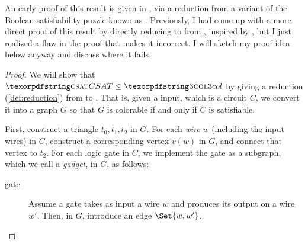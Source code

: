 An early proof of this result is given in \textcite{karp.np}, via a reduction
from a variant of the Boolean satisfiability puzzle known as
.  Previously, I had come up with a more direct proof of this
result by directly reducing to  from \CSAT, inspired by
\textcite{potapov.3col}, but I just realized a flaw in the proof that makes it
incorrect.  I will sketch my proof idea below anyway and discuss where it
fails.


\begin{aside}
\begin{proof}
  We will show that \(\CSAT \le \Problem{3col}\) by giving a reduction
  (\cref{def:reduction}) from \CSAT{} to .  That is, given a
  \CSAT{} input, which is a circuit \(C\), we convert it into a graph \(G\) so
  that \(G\) is colorable if and only if \(C\) is satisfiable.

  First, construct a triangle \(t_0, t_1, t_2\) in \(G\).  For each \emph{wire}
  \(w\) (including the input wires) in \(C\), construct a corresponding vertex
  \(v(w)\) in \(G\), and connect that vertex to \(t_2\).  For each logic gate
  in \(C\), we implement the gate as a subgraph, which we call a \emph{gadget},
  in \(G\), as follows:
  \begin{description}

    \item[\NOT{} gate] Assume a \NOT{} gate takes as input a wire \(w\) and
      produces its output on a wire \(w'\).  Then, in \(G\), introduce an edge
      \(\Set{w, w'}\).

      \begin{center}
\end{center}
\end{description}
\end{proof}
\end{aside}
